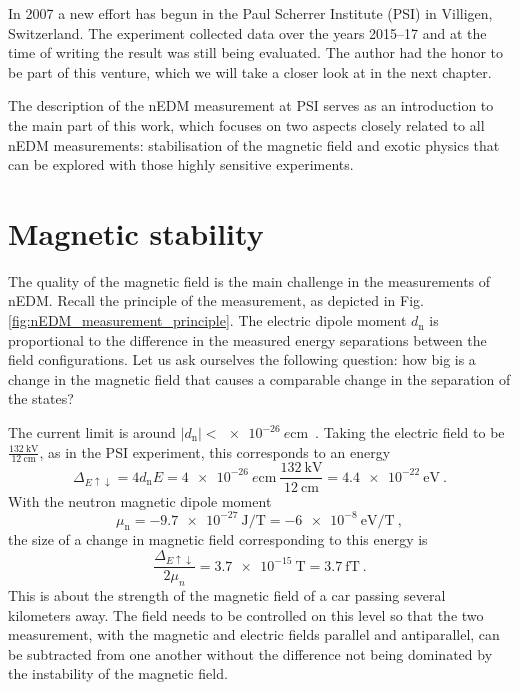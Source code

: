 In 2007 a new effort has begun in the Paul Scherrer Institute (PSI) in Villigen, Switzerland. The experiment collected data over the years 2015--17 and at the time of writing the result was still being evaluated. The author had the honor to be part of this venture, which we will take a closer look at in the next chapter.

The description of the nEDM measurement at PSI serves as an introduction to the main part of this work, which focuses on two aspects closely related to all nEDM measurements: stabilisation of the magnetic field and exotic physics that can be explored with those highly sensitive experiments.



\section{Magnetic stability}
The quality of the magnetic field is the main challenge in the measurements of nEDM. Recall the principle of the measurement, as depicted in Fig.\,\ref{fig:nEDM_measurement_principle}. The electric dipole moment $d_\text{n}$ is proportional to the difference in the measured energy separations between the field configurations. Let us ask ourselves the following question: how big is a change in the magnetic field that causes a comparable change in the separation of the states?

The current limit is around $|d_\text{n}| < \SI{e-26}{\elementarycharge\centi\meter}$~\cite{PhysRevLett.97.131801}. Taking the electric field to be $\frac{ \SI{132}{\kilo\volt} }{ \SI{12}{\centi\meter} }$, as in the PSI experiment, this corresponds to an energy
\begin{equation}
  \Delta_{E\uparrow\downarrow} = 4 d_\text{n} E = \SI{4e-26}{\elementarycharge\centi\meter} \ \frac{ \SI{132}{\kilo\volt} }{ \SI{12}{\centi\meter} } = \SI{4.4e-22}{\electronvolt} \ .
\end{equation}
With the neutron magnetic dipole moment
\begin{equation}
  \mu_\text{n} = \SI{-9.7e-27}{\joule\per\tesla} = \SI{-6e-8}{\electronvolt\per\tesla} \ ,
\end{equation}
the size of a change in magnetic field corresponding to this energy is
\begin{equation}
  \frac{ \Delta_{E\uparrow\downarrow} }{2 \mu_n} = \SI{3.7e-15}{\tesla} = \SI{3.7}{\femto\tesla} \ .
\end{equation}
This is about the strength of the magnetic field of a car passing several kilometers away. The field needs to be controlled on this level so that the two measurement, with the magnetic and electric fields parallel and antiparallel, can be subtracted from one another without the difference not being dominated by the instability of the magnetic field.

